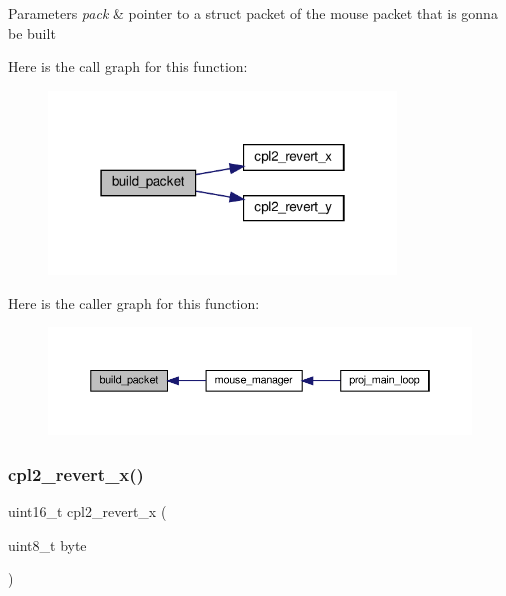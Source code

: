 \begin{DoxyParams}{Parameters}
{\em pack} & pointer to a struct packet of the mouse packet that is gonna be built \\
\hline
\end{DoxyParams}
Here is the call graph for this function\+:
\nopagebreak
\begin{figure}[H]
\begin{center}
\leavevmode
\includegraphics[width=262pt]{group__mouse_ga7d38d68c1222c116e819346c1c3d36f1_cgraph}
\end{center}
\end{figure}
Here is the caller graph for this function\+:
\nopagebreak
\begin{figure}[H]
\begin{center}
\leavevmode
\includegraphics[width=350pt]{group__mouse_ga7d38d68c1222c116e819346c1c3d36f1_icgraph}
\end{center}
\end{figure}
\mbox{\label{group__mouse_gaca472150bedc1bf9e0008ffd9929b165}} 
\subsubsection{\texorpdfstring{cpl2\+\_\+revert\+\_\+x()}{cpl2\_revert\_x()}}
{\footnotesize\ttfamily uint16\+\_\+t cpl2\+\_\+revert\+\_\+x (\begin{DoxyParamCaption}\item[{uint8\+\_\+t}]{byte }\end{DoxyParamCaption})}



